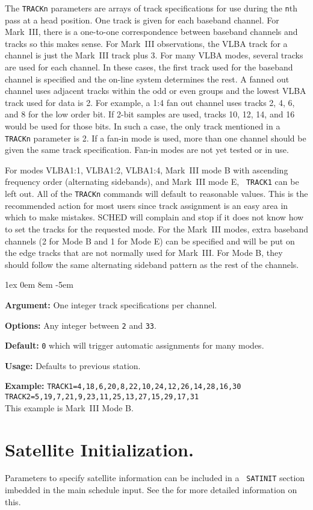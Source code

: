 \documentclass{report}
\newcommand{\rcwbox}[5]{
  \begin{list}{}{\parsep 1ex  \itemsep 0em
                 \leftmargin 8em  \itemindent -5em }
    \item {\bf Argument:} #1
    \item {\bf Options:}  #2
    \item {\bf Default:}  #3
    \item {\bf Usage:}    #4
    \item {\bf Example:}  #5
  \end{list}
}
\begin{document}
   The {\tt TRACKn} parameters are arrays of track specifications for
use during the {\tt n}th pass at a head position. One track is given
for each baseband channel. For Mark~III, there is a one-to-one
correspondence between baseband channels and tracks so this makes
sense.  For Mark~III observations, the VLBA track for a channel is
just the Mark~III track plus 3.  For many VLBA modes, several tracks
are used for each channel. In these cases, the first track used for
the baseband channel is specified and the on-line system determines
the rest. A fanned out channel uses adjacent tracks within the odd or
even groups and the lowest VLBA track used for data is 2. For example,
a 1:4 fan out channel uses tracks 2, 4, 6, and 8 for the low order
bit. If 2-bit samples are used, tracks 10, 12, 14, and 16 would be
used for those bits.  In such a case, the only track mentioned in a
{\tt TRACKn} parameter is 2.  If a fan-in mode is used, more than one
channel should be given the same track specification.  Fan-in modes
are not yet tested or in use.

For modes VLBA1:1, VLBA1:2, VLBA1:4, Mark~III mode B with ascending
frequency order (alternating sidebands), and Mark~III mode E, {\tt
TRACK1} can be left out. All of the {\tt TRACKn} commands will default
to reasonable values. This is the recommended action for most users
since track assignment is an easy area in which to make mistakes. {\sc
SCHED} will complain and stop if it does not know how to set the
tracks for the requested mode. For the Mark~III modes, extra baseband
channels (2 for Mode B and 1 for Mode E) can be specified and will be
put on the edge tracks that are not normally used for Mark~III. For
Mode B, they should follow the same alternating sideband pattern as
the rest of the channels.

\rcwbox
{One integer track specifications per channel.}
{Any integer between {\tt 2} and {\tt 33}.}
{{\tt 0} which will trigger automatic assignments for many modes.}
{Defaults to previous station.}
{{\tt TRACK1=4,18,6,20,8,22,10,24,12,26,14,28,16,30} \\
 {\tt TRACK2=5,19,7,21,9,23,11,25,13,27,15,29,17,31} \\
This example is Mark~III Mode B.}


\section{\label{SEC:SATINIT}Satellite Initialization.}

Parameters to specify satellite information can be included in a {\tt
SATINIT} section imbedded in the main schedule input.  See the
 for more detailed
information on this.
\end{document}
